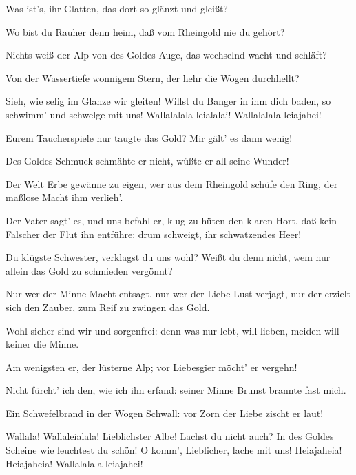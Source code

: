 \begin{drama}
\Alberichspeaks


Was ist's, ihr Glatten, das dort so glänzt und gleißt?
 

Wo bist du Rauher denn heim,
daß vom Rheingold nie du gehört?
 

\Wellgundespeaks
Nichts weiß der Alp von des Goldes Auge,
das wechselnd wacht und schläft?
 

\Woglindespeaks
Von der Wassertiefe wonnigem Stern,
der hehr die Wogen durchhellt?
 

Sieh, wie selig im Glanze wir gleiten!
Willst du Banger in ihm dich baden,
so schwimm' und schwelge mit uns!
Wallalalala leialalai! Wallalalala leiajahei!
 

\Alberichspeaks
Eurem Taucherspiele nur taugte das Gold?
Mir gält' es dann wenig!
 

\Woglindespeaks
Des Goldes Schmuck schmähte er nicht,
wüßte er all seine Wunder!
 

\Wellgundespeaks
Der Welt Erbe gewänne zu eigen,
wer aus dem Rheingold schüfe den Ring,
der maßlose Macht ihm verlieh'.
 

\Flosshildespeaks
Der Vater sagt' es, und uns befahl er,
klug zu hüten den klaren Hort,
daß kein Falscher der Flut ihn entführe:
drum schweigt, ihr schwatzendes Heer!
 

\Wellgundespeaks
Du klügste Schwester, verklagst du uns wohl?
Weißt du denn nicht, wem nur allein
das Gold zu schmieden vergönnt?
 

\Woglindespeaks
Nur wer der Minne Macht entsagt,
nur wer der Liebe Lust verjagt,
nur der erzielt sich den Zauber,
zum Reif zu zwingen das Gold.
 

\Wellgundespeaks
Wohl sicher sind wir und sorgenfrei:
denn was nur lebt, will lieben,
meiden will keiner die Minne.
 

\Woglindespeaks
Am wenigsten er, der lüsterne Alp;
vor Liebesgier möcht' er vergehn!
 

\Flosshildespeaks
Nicht fürcht' ich den, wie ich ihn erfand:
seiner Minne Brunst brannte fast mich.
 

\Wellgundespeaks
Ein Schwefelbrand in der Wogen Schwall:
vor Zorn der Liebe zischt er laut!
 

Wallala! Wallaleialala!
Lieblichster Albe! Lachst du nicht auch?
In des Goldes Scheine wie leuchtest du schön!
O komm', Lieblicher, lache mit uns!
Heiajaheia! Heiajaheia! Wallalalala leiajahei!
 



\end{drama}
